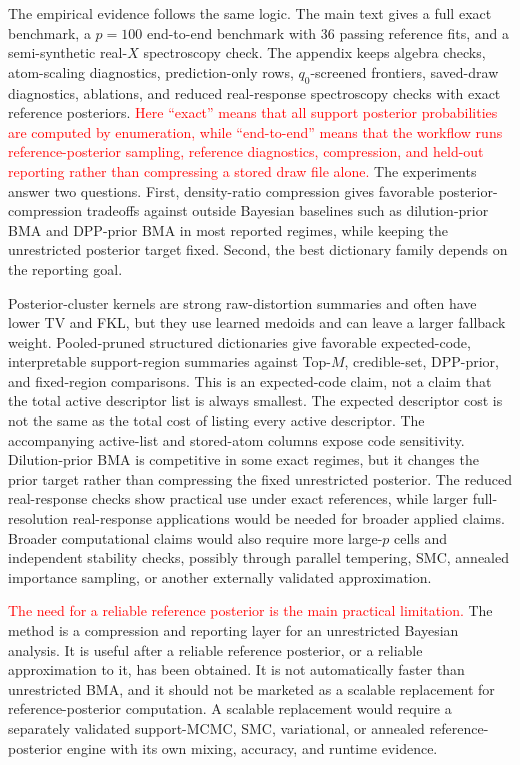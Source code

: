 \documentclass[twoside,11pt]{article}
\newcommand{\rev}[1]{\textcolor{red}{#1}}
\begin{document}
The empirical evidence follows the same logic. The main text gives a full exact benchmark, a \(p=100\) end-to-end benchmark with \(36\) passing reference fits, and a semi-synthetic real-\(X\) spectroscopy check. The appendix keeps algebra checks, atom-scaling diagnostics, prediction-only rows, \(q_0\)-screened frontiers, saved-draw diagnostics, ablations, and reduced real-response spectroscopy checks with exact reference posteriors. \rev{Here ``exact'' means that all support posterior probabilities are computed by enumeration, while ``end-to-end'' means that the workflow runs reference-posterior sampling, reference diagnostics, compression, and held-out reporting rather than compressing a stored draw file alone.} The experiments answer two questions. First, density-ratio compression gives favorable posterior-compression tradeoffs against outside Bayesian baselines such as dilution-prior BMA and DPP-prior BMA in most reported regimes, while keeping the unrestricted posterior target fixed. Second, the best dictionary family depends on the reporting goal.

Posterior-cluster kernels are strong raw-distortion summaries and often have lower TV and FKL, but they use learned medoids and can leave a larger fallback weight. Pooled-pruned structured dictionaries give favorable expected-code, interpretable support-region summaries against Top-\(M\), credible-set, DPP-prior, and fixed-region comparisons. This is an expected-code claim, not a claim that the total active descriptor list is always smallest. The expected descriptor cost is not the same as the total cost of listing every active descriptor. The accompanying active-list and stored-atom columns expose code sensitivity. Dilution-prior BMA is competitive in some exact regimes, but it changes the prior target rather than compressing the fixed unrestricted posterior. The reduced real-response checks show practical use under exact references, while larger full-resolution real-response applications would be needed for broader applied claims. Broader computational claims would also require more large-\(p\) cells and independent stability checks, possibly through parallel tempering, SMC, annealed importance sampling, or another externally validated approximation.

\rev{The need for a reliable reference posterior is the main practical limitation.} The method is a compression and reporting layer for an unrestricted Bayesian analysis. It is useful after a reliable reference posterior, or a reliable approximation to it, has been obtained. It is not automatically faster than unrestricted BMA, and it should not be marketed as a scalable replacement for reference-posterior computation. A scalable replacement would require a separately validated support-MCMC, SMC, variational, or annealed reference-posterior engine with its own mixing, accuracy, and runtime evidence.
\end{document}
